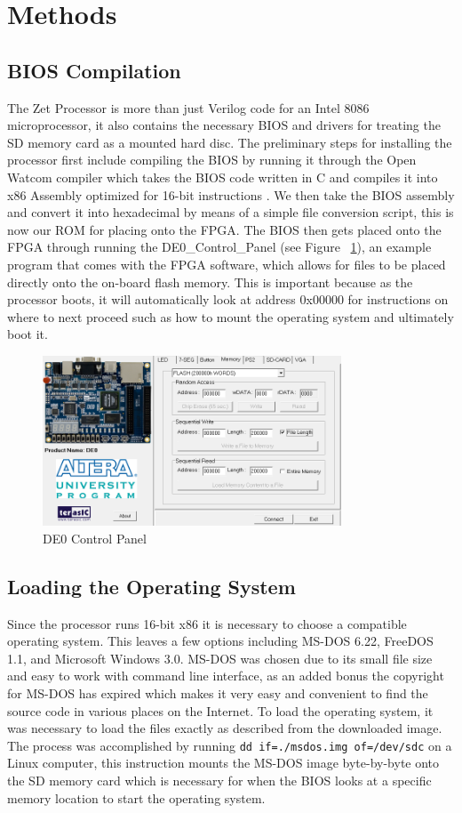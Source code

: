 \documentclass[pdftex,10.5pt]{report}
\begin{document}
\newpage

\section{Methods}
\subsection{BIOS Compilation}
The Zet Processor is more than just Verilog code for an Intel 8086 microprocessor, it also contains the necessary BIOS and drivers for treating the SD memory card as a mounted hard disc. The preliminary steps for installing the processor first include compiling the BIOS by running it through the Open Watcom compiler which takes the BIOS code written in C and compiles it into x86 Assembly optimized for 16-bit instructions \cite{Watcom}. We then take the BIOS assembly and convert it into hexadecimal by means of a simple file conversion script, this is now our ROM for placing onto the FPGA. The BIOS then gets placed onto the FPGA through running the DE0\_Control\_Panel (see Figure ~\ref{fig:control}), an example program that comes with the FPGA software, which allows for files to be placed directly onto the on-board flash memory. This is important because as the processor boots, it will automatically look at address 0x00000 for instructions on where to next proceed such as how to mount the operating system and ultimately boot it. 

\begin{figure}[!h]
	\centering
	\includegraphics[width=3.5in]{figures/de0controlpanel}
	\caption{DE0 Control Panel}
	\label{fig:control}
\end{figure}

\subsection{Loading the Operating System}
Since the processor runs 16-bit x86 it is necessary to choose a compatible operating system. This leaves a few options including MS-DOS 6.22, FreeDOS 1.1, and Microsoft Windows 3.0. MS-DOS was chosen due to its small file size and easy to work with command line interface, as an added bonus the copyright for MS-DOS has expired which makes it very easy and convenient to find the source code in various places on the Internet. To load the operating system, it was necessary to load the files exactly as described from the downloaded image. The process was accomplished by running {\tt dd if=./msdos.img of=/dev/sdc} on a Linux computer, this instruction mounts the MS-DOS image byte-by-byte onto the SD memory card which is necessary for when the BIOS looks at a specific memory location to start the operating system.
\end{document}
